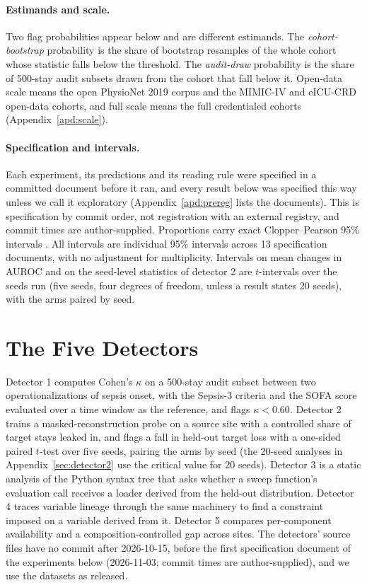 \documentclass[10pt]{article}
\theoremstyle{definition}
\begin{document}
\paragraph{Estimands and scale.} Two flag probabilities appear below and are different estimands. The \emph{cohort-bootstrap} probability is the share of bootstrap resamples \citep{efron1979bootstrap} of the whole cohort whose statistic falls below the threshold. The \emph{audit-draw} probability is the share of 500-stay audit subsets drawn from the cohort that fall below it. Open-data scale means the open PhysioNet 2019 corpus and the MIMIC-IV and eICU-CRD open-data cohorts, and full scale means the full credentialed cohorts (Appendix~\ref{apd:scale}).

\paragraph{Specification and intervals.} Each experiment, its predictions and its reading rule were specified in a committed document before it ran, and every result below was specified this way unless we call it exploratory (Appendix~\ref{apd:prereg} lists the documents). This is specification by commit order, not registration with an external registry, and commit times are author-supplied. Proportions carry exact Clopper--Pearson 95\% intervals \citep{clopper1934confidence}. All intervals are individual 95\% intervals across 13 specification documents, with no adjustment for multiplicity. Intervals on mean changes in AUROC and on the seed-level statistics of detector 2 are $t$-intervals over the seeds run (five seeds, four degrees of freedom, unless a result states 20 seeds), with the arms paired by seed.

\section{The Five Detectors}
\label{sec:detectors}

Detector 1 computes Cohen's $\kappa$ \citep{cohen1960kappa} on a 500-stay audit subset between two operationalizations of sepsis onset, with the Sepsis-3 criteria \citep{singer2016sepsis3} and the SOFA score \citep{vincent1996sofa} evaluated over a time window as the reference, and flags $\kappa<0.60$. Detector 2 trains a masked-reconstruction probe on a source site with a controlled share of target stays leaked in, and flags a fall in held-out target loss with a one-sided paired $t$-test over five seeds, pairing the arms by seed (the 20-seed analyses in Appendix~\ref{sec:detector2} use the critical value for 20 seeds). Detector 3 is a static analysis of the Python syntax tree that asks whether a sweep function's evaluation call receives a loader derived from the held-out distribution. Detector 4 traces variable lineage through the same machinery to find a constraint imposed on a variable derived from it. Detector 5 compares per-component availability and a composition-controlled gap across sites. The detectors' source files have no commit after 2026-10-15, before the first specification document of the experiments below (2026-11-03; commit times are author-supplied), and we use the datasets \citep{johnson2023mimiciv,pollard2018eicu,reyna2020early,goldberger2000physiobank} as released.
\end{document}

